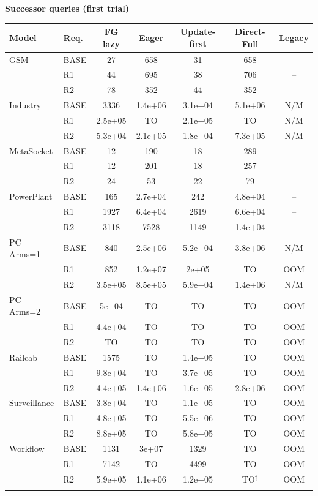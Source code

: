 \clearpage\noindent\textbf{Successor queries (first trial)}\par\smallskip
\begingroup\scriptsize\setlength{\tabcolsep}{3pt}
\begin{tabular}{@{}llccccc@{}}
\toprule
Model & Req. & FG lazy & Eager & Update-first & Direct-Full & Legacy\\
\midrule
GSM & BASE & 27 & 658 & 31 & 658 & --\\
 & R1 & 44 & 695 & 38 & 706 & --\\
 & R2 & 78 & 352 & 44 & 352 & --\\
\addlinespace[2pt]
Industry & BASE & 3336 & 1.4e+06 & 3.1e+04 & 5.1e+06 & N/M\\
 & R1 & 2.5e+05 & TO & 2.1e+05 & TO & N/M\\
 & R2 & 5.3e+04 & 2.1e+05 & 1.8e+04 & 7.3e+05 & N/M\\
\addlinespace[2pt]
MetaSocket & BASE & 12 & 190 & 18 & 289 & --\\
 & R1 & 12 & 201 & 18 & 257 & --\\
 & R2 & 24 & 53 & 22 & 79 & --\\
\addlinespace[2pt]
PowerPlant & BASE & 165 & 2.7e+04 & 242 & 4.8e+04 & --\\
 & R1 & 1927 & 6.4e+04 & 2619 & 6.6e+04 & --\\
 & R2 & 3118 & 7528 & 1149 & 1.4e+04 & --\\
\addlinespace[2pt]
PC Arms=1 & BASE & 840 & 2.5e+06 & 5.2e+04 & 3.8e+06 & N/M\\
 & R1 & 852 & 1.2e+07 & 2e+05 & TO & OOM\\
 & R2 & 3.5e+05 & 8.5e+05 & 5.9e+04 & 1.4e+06 & N/M\\
\addlinespace[2pt]
PC Arms=2 & BASE & 5e+04 & TO & TO & TO & OOM\\
 & R1 & 4.4e+04 & TO & TO & TO & OOM\\
 & R2 & TO & TO & TO & TO & OOM\\
\addlinespace[2pt]
Railcab & BASE & 1575 & TO & 1.4e+05 & TO & OOM\\
 & R1 & 9.8e+04 & TO & 3.7e+05 & TO & OOM\\
 & R2 & 4.4e+05 & 1.4e+06 & 1.6e+05 & 2.8e+06 & OOM\\
\addlinespace[2pt]
Surveillance & BASE & 3.8e+04 & TO & 1.1e+05 & TO & OOM\\
 & R1 & 4.8e+05 & TO & 5.5e+06 & TO & OOM\\
 & R2 & 8.8e+05 & TO & 5.8e+05 & TO & OOM\\
\addlinespace[2pt]
Workflow & BASE & 1131 & 3e+07 & 1329 & TO & OOM\\
 & R1 & 7142 & TO & 4499 & TO & OOM\\
 & R2 & 5.9e+05 & 1.1e+06 & 1.2e+05 & TO$^{\ddagger}$ & OOM\\
\addlinespace[2pt]
\bottomrule
\end{tabular}\endgroup


